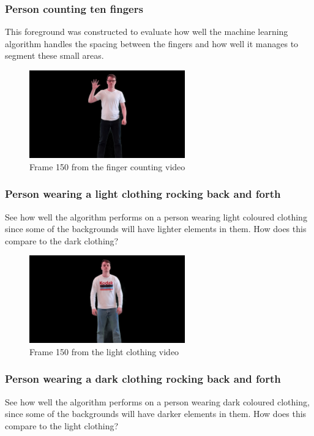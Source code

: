 \subsubsection{Person counting ten fingers}
This foreground was constructed to evaluate how well the machine learning algorithm handles the spacing between the fingers and how well it manages to segment these small areas.

\begin{figure}[H]
    \centering
    \includegraphics[width=0.6\textwidth]{img/video_frame_150/FG_Counting-Fingers_150.jpg}
    \caption{Frame 150 from the finger counting video}
    \label{fig:foreground_counting}
\end{figure}


\subsubsection{Person wearing a light clothing rocking back and forth}
See how well the algorithm performs on a person wearing light coloured clothing since some of the backgrounds will have lighter elements in them. How does this compare to the dark clothing?

\begin{figure}[H]
    \centering
    \includegraphics[width=0.6\textwidth]{img/video_frame_150/FG_Rocking-Light_150.jpg}
    \caption{Frame 150 from the light clothing video}
    \label{fig:foreground_light_clothing}
\end{figure}


\subsubsection{Person wearing a dark clothing rocking back and forth}
See how well the algorithm performs on a person wearing dark coloured clothing, since some of the backgrounds will have darker elements in them. How does this compare to the light clothing?

